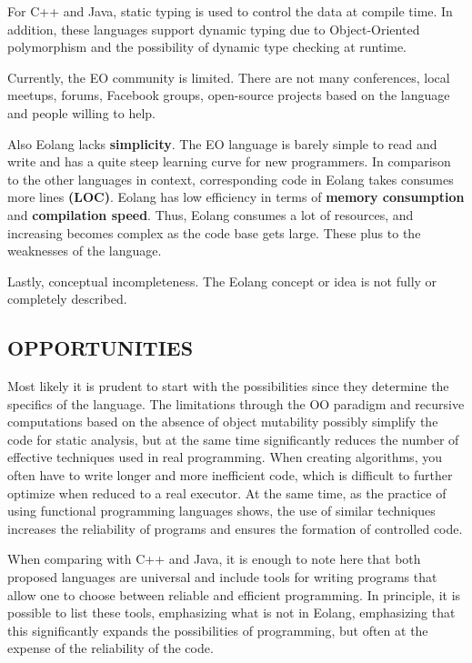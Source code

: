 \documentclass[12pt]{book}
\begin{document}
{{For C++ and Java, static typing is used to control the data at compile time. In addition, these languages support dynamic typing due to Object-Oriented polymorphism and the possibility of dynamic type checking at runtime.

Currently, the EO community is limited. There are not many conferences, local meetups, forums, Facebook groups, open-source projects based on the language and people willing to help.

Also Eolang lacks \textbf{simplicity}. The EO language is barely simple to read and write and has a quite steep learning curve for new programmers. In comparison to the other languages in context, corresponding code in Eolang takes consumes more lines \textbf{(LOC)}. Eolang has low efficiency in terms of \textbf{memory consumption} and \textbf{compilation speed}. Thus, Eolang consumes a lot of resources, and increasing becomes complex as the code base gets large. These plus to the weaknesses of the language.

Lastly, conceptual incompleteness. The Eolang concept or idea is not fully or completely described.

\subsection{OPPORTUNITIES}
Most likely it is prudent to start with the possibilities since they determine the specifics of the language. The limitations through the OO paradigm and recursive computations based on the absence of object mutability possibly simplify the code for static analysis, but at the same time significantly reduces the number of effective techniques used in real programming. When creating algorithms, you often have to write longer and more inefficient code, which is difficult to further optimize when reduced to a real executor. At the same time, as the practice of using functional programming languages shows, the use of similar techniques increases the reliability of programs and ensures the formation of controlled code.

When comparing with C++ and Java, it is enough to note here that both proposed languages are universal and include tools for writing programs that allow one to choose between reliable and efficient programming. In principle, it is possible to list these tools, emphasizing what is not in Eolang, emphasizing that this significantly expands the possibilities of programming, but often at the expense of the reliability of the code.

}}
\end{document}
